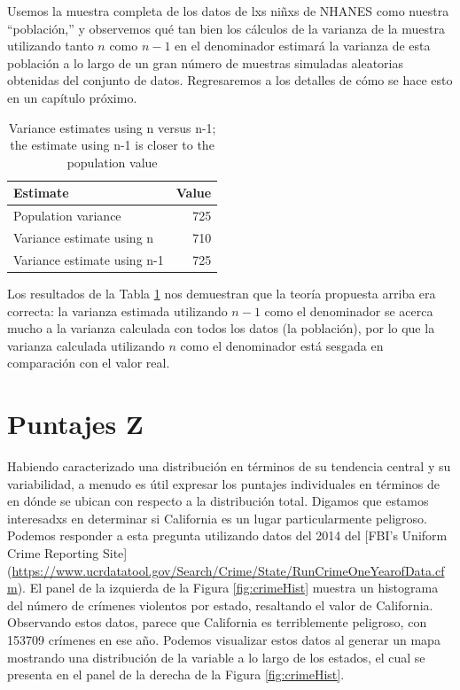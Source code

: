 \documentclass[
  12pt,
]{book}
\begin{document}
Usemos la muestra completa de los datos de lxs niñxs de NHANES como nuestra ``población,'' y observemos qué tan bien los cálculos de la varianza de la muestra utilizando tanto \(n\) como \(n-1\) en el denominador estimará la varianza de esta población a lo largo de un gran número de muestras simuladas aleatorias obtenidas del conjunto de datos. Regresaremos a los detalles de cómo se hace esto en un capítulo próximo.

\begin{table}

\caption{\label{tab:varsim}Variance estimates using n versus n-1; the estimate using n-1 is closer to the population value}
\centering
\begin{tabular}[t]{l|r}
\hline
Estimate & Value\\
\hline
Population variance & 725\\
\hline
Variance estimate using n & 710\\
\hline
Variance estimate using n-1 & 725\\
\hline
\end{tabular}
\end{table}

Los resultados de la Tabla \ref{tab:varsim} nos demuestran que la teoría propuesta arriba era correcta: la varianza estimada utilizando \(n - 1\) como el denominador se acerca mucho a la varianza calculada con todos los datos (la población), por lo que la varianza calculada utilizando \(n\) como el denominador está sesgada en comparación con el valor real.

\hypertarget{puntajes-z}{%
\section{Puntajes Z}\label{puntajes-z}}

Habiendo caracterizado una distribución en términos de su tendencia central y su variabilidad, a menudo es útil expresar los puntajes individuales en términos de en dónde se ubican con respecto a la distribución total. Digamos que estamos interesadxs en determinar si California es un lugar particularmente peligroso. Podemos responder a esta pregunta utilizando datos del 2014 del {[}FBI's Uniform Crime Reporting Site{]} (\url{https://www.ucrdatatool.gov/Search/Crime/State/RunCrimeOneYearofData.cfm}). El panel de la izquierda de la Figura \ref{fig:crimeHist} muestra un histograma del número de crímenes violentos por estado, resaltando el valor de California. Observando estos datos, parece que California es terriblemente peligroso, con 153709 crímenes en ese año. Podemos visualizar estos datos al generar un mapa mostrando una distribución de la variable a lo largo de los estados, el cual se presenta en el panel de la derecha de la Figura \ref{fig:crimeHist}.
\end{document}
